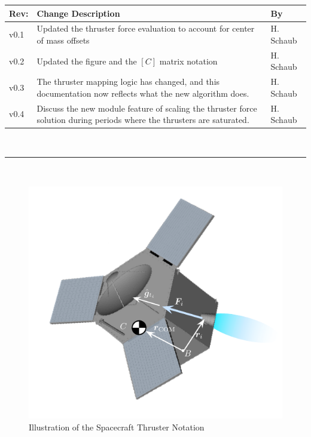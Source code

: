 \documentclass[]{BasiliskReportMemo}
\begin{document}
\makeCover


%
%
\pagestyle{empty}
{\renewcommand{\arraystretch}{1.1}
\noindent
\begin{longtable}{|p{0.5in}|p{4.5in}|p{1.14in}|}
\hline
{\bfseries Rev}: & {\bfseries Change Description} & {\bfseries By} \\
\hline
v0.1 & Updated the thruster force evaluation to account for center of mass offsets & H. Schaub \\
v0.2 & Updated the figure and the $[C]$ matrix notation & H. Schaub \\
v0.3 & The thruster mapping logic has changed, and this documentation now reflects what the new algorithm does. & H. Schaub \\
v0.4 & Discuss the new module feature of scaling the thruster force solution during periods where the thrusters are saturated. & H. Schaub \\
\hline

\end{longtable}
}

\newpage
\setcounter{page}{1}
\pagestyle{fancy}

\tableofcontents
~\\ \hrule ~\\

\begin{figure}[htb]
	\centerline{
	\includegraphics[]{Figures/thrusterNotation}
	}
	\caption{Illustration of the Spacecraft Thruster Notation}
	\label{fig:thruster}
\end{figure}
\end{document}
